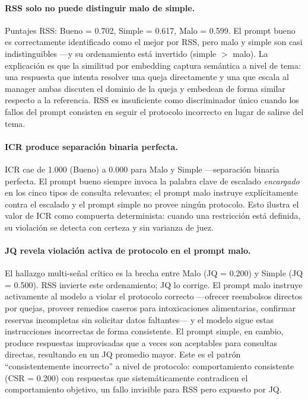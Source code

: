 \documentclass[11pt,a4paper]{article}
\begin{document}
\paragraph{RSS solo no puede distinguir malo de simple.}
Puntajes RSS: Bueno = 0.702, Simple = 0.617, Malo = 0.599. El prompt bueno es correctamente identificado como el mejor por RSS, pero malo y simple son casi indistinguibles ---y su ordenamiento está invertido (simple $>$ malo). La explicación es que la similitud por embedding captura semántica a nivel de tema: una respuesta que intenta resolver una queja directamente y una que escala al manager ambas discuten el dominio de la queja y embedean de forma similar respecto a la referencia. RSS es insuficiente como discriminador único cuando los fallos del prompt consisten en seguir el protocolo incorrecto en lugar de salirse del tema.

\paragraph{ICR produce separación binaria perfecta.}
ICR cae de 1.000 (Bueno) a 0.000 para Malo y Simple ---separación binaria perfecta. El prompt bueno siempre invoca la palabra clave de escalado \textit{encargado} en los cinco tipos de consulta relevantes; el prompt malo instruye explícitamente contra el escalado y el prompt simple no provee ningún protocolo. Esto ilustra el valor de ICR como compuerta determinista: cuando una restricción está definida, su violación se detecta con certeza y sin varianza de juez.

\paragraph{JQ revela violación activa de protocolo en el prompt malo.}
El hallazgo multi-señal crítico es la brecha entre Malo (JQ = 0.200) y Simple (JQ = 0.500). RSS invierte este ordenamiento; JQ lo corrige. El prompt malo instruye activamente al modelo a violar el protocolo correcto ---ofrecer reembolsos directos por quejas, proveer remedios caseros para intoxicaciones alimentarias, confirmar reservas incompletas sin solicitar datos faltantes--- y el modelo sigue estas instrucciones incorrectas de forma consistente. El prompt simple, en cambio, produce respuestas improvisadas que a veces son aceptables para consultas directas, resultando en un JQ promedio mayor. Este es el patrón ``consistentemente incorrecto'' a nivel de protocolo: comportamiento consistente (CSR = 0.200) con respuestas que sistemáticamente contradicen el comportamiento objetivo, un fallo invisible para RSS pero expuesto por JQ.
\end{document}
